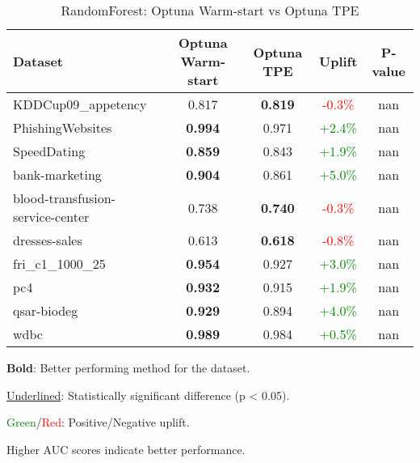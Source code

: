 \begin{table}[htbp]
\centering
\caption{RandomForest: Optuna Warm-start vs Optuna TPE}
\label{tab:randomforest_warmstart_vs_optuna}
\begin{tabular}{lcccc}
\toprule
Dataset & Optuna Warm-start & Optuna TPE & Uplift & P-value \\
\midrule
KDDCup09\_appetency & 0.817 & \textbf{0.819} & \textcolor{red}{-0.3\%} & nan \\
PhishingWebsites & \textbf{0.994} & 0.971 & \textcolor{green}{+2.4\%} & nan \\
SpeedDating & \textbf{0.859} & 0.843 & \textcolor{green}{+1.9\%} & nan \\
bank-marketing & \textbf{0.904} & 0.861 & \textcolor{green}{+5.0\%} & nan \\
blood-transfusion-service-center & 0.738 & \textbf{0.740} & \textcolor{red}{-0.3\%} & nan \\
dresses-sales & 0.613 & \textbf{0.618} & \textcolor{red}{-0.8\%} & nan \\
fri\_c1\_1000\_25 & \textbf{0.954} & 0.927 & \textcolor{green}{+3.0\%} & nan \\
pc4 & \textbf{0.932} & 0.915 & \textcolor{green}{+1.9\%} & nan \\
qsar-biodeg & \textbf{0.929} & 0.894 & \textcolor{green}{+4.0\%} & nan \\
wdbc & \textbf{0.989} & 0.984 & \textcolor{green}{+0.5\%} & nan \\
\bottomrule
\end{tabular}
\begin{tablenotes}
\small
\item \textbf{Bold}: Better performing method for the dataset.
\item \underline{Underlined}: Statistically significant difference (p < 0.05).
\item \textcolor{green}{Green}/\textcolor{red}{Red}: Positive/Negative uplift.
\item Higher AUC scores indicate better performance.
\end{tablenotes}
\end{table}